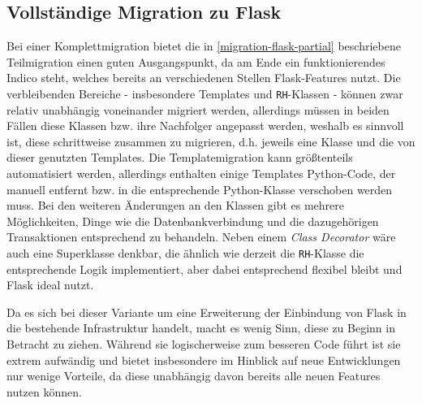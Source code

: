 \subsection{Vollständige Migration zu Flask}
Bei einer Komplettmigration bietet die in \autoref{migration-flask-partial} beschriebene
Teilmigration einen guten Ausgangspunkt, da am Ende ein funktionierendes Indico steht, welches
bereits an verschiedenen Stellen Flask-Features nutzt. Die verbleibenden Bereiche - insbesondere
Templates und \lstinline{RH}-Klassen - können zwar relativ unabhängig voneinander migriert werden,
allerdings müssen in beiden Fällen diese Klassen bzw. ihre Nachfolger angepasst werden, weshalb es
sinnvoll ist, diese schrittweise zusammen zu migrieren, d.h. jeweils eine Klasse und die von dieser
genutzten Templates. Die Templatemigration kann größtenteils automatisiert werden, allerdings
enthalten einige Templates Python-Code, der manuell entfernt bzw. in die entsprechende Python-Klasse
verschoben werden muss. Bei den weiteren Änderungen an den Klassen gibt es mehrere Möglichkeiten,
Dinge wie die Datenbankverbindung und die dazugehörigen Transaktionen entsprechend zu behandeln.
Neben einem \emph{Class Decorator} wäre auch eine Superklasse denkbar, die ähnlich wie derzeit die
\lstinline{RH}-Klasse die entsprechende Logik implementiert, aber dabei entsprechend flexibel bleibt
und Flask ideal nutzt.

Da es sich bei dieser Variante um eine Erweiterung der Einbindung von Flask in die bestehende
Infrastruktur handelt, macht es wenig Sinn, diese zu Beginn in Betracht zu ziehen. Während sie
logischerweise zum besseren Code führt ist sie extrem aufwändig und bietet insbesondere im Hinblick
auf neue Entwicklungen nur wenige Vorteile, da diese unabhängig davon bereits alle neuen Features
nutzen können.
